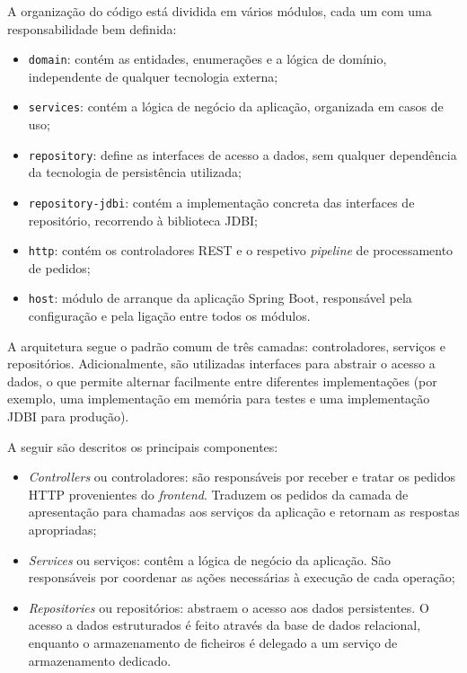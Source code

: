 A organização do código está dividida em vários módulos, cada um com uma 
responsabilidade bem definida:

\begin{itemize}
    \item \texttt{domain}: contém as entidades, enumerações e a lógica de 
    domínio, independente de qualquer tecnologia externa;
    \item \texttt{services}: contém a lógica de negócio da aplicação, 
    organizada em casos de uso;
    \item \texttt{repository}: define as interfaces de acesso a dados, sem 
    qualquer dependência da tecnologia de persistência utilizada;
    \item \texttt{repository-jdbi}: contém a implementação concreta das 
    interfaces de repositório, recorrendo à biblioteca JDBI;
    \item \texttt{http}: contém os controladores REST e o respetivo 
    \textit{pipeline} de processamento de pedidos;
    \item \texttt{host}: módulo de arranque da aplicação Spring Boot, 
    responsável pela configuração e pela ligação entre todos os módulos.
\end{itemize}

A arquitetura segue o padrão comum de três camadas: controladores, serviços e 
repositórios. Adicionalmente, são utilizadas interfaces para abstrair o acesso 
a dados, o que permite alternar facilmente entre diferentes implementações 
(por exemplo, uma implementação em memória para testes e uma implementação 
JDBI para produção).

A seguir são descritos os principais componentes:

\begin{itemize}
    \item \textit{Controllers} ou controladores: são responsáveis por receber 
    e tratar os pedidos HTTP provenientes do \textit{frontend}. Traduzem os 
    pedidos da camada de apresentação para chamadas aos serviços da aplicação 
    e retornam as respostas apropriadas;
    \item \textit{Services} ou serviços: contêm a lógica de negócio da 
    aplicação. São responsáveis por coordenar as ações necessárias à execução 
    de cada operação;
    \item \textit{Repositories} ou repositórios: abstraem o acesso aos dados 
    persistentes. O acesso a dados estruturados é feito através da base de 
    dados relacional, enquanto o armazenamento de ficheiros é delegado a um 
    serviço de armazenamento dedicado.
\end{itemize}

